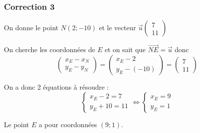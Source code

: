 \documentclass[15pt, mathserif]{beamer}
\begin{document}
\begin{frame}
\vspace{-10mm}
	\frametitle{Correction 3}
\vspace*{0.5cm} 
 On donne le point $N(2;-10)$ et le vecteur $\vec{u}\begin{pmatrix} 7\\ 11 \end{pmatrix}$ 
 
 On cherche les coordonnées de $E$ et on sait que $\vec{NE}=\vec{u}$ donc $$\begin{pmatrix} x_{E}-x_N \\ y_{E}-y_N \end{pmatrix}=\begin{pmatrix} x_{E}-2 \\ y_{E}-\left(-10\right)\end{pmatrix}=\begin{pmatrix} 7 \\ 11 \end{pmatrix}$$ 
 
 On a donc 2 équations à résoudre :  
 $$ \left\{ \begin{array}{cc} 
  x_{E}-2=7 \\ 
  y_{E}+10=11 
 \end{array} \right. \Leftrightarrow \left\{ \begin{array}{cc} 
  x_{E}=9 \\ 
 y_{E}=1 
 \end{array} \right. $$ 
 
 Le point $E$ a pour coordonnées $(9;1)$.\end{frame}
\end{document}
